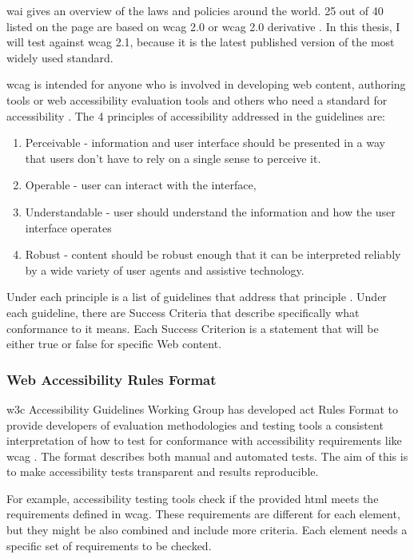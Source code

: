 \documentclass{master_thesis}
\begin{document}
\ac{wai} gives an overview of the laws and policies around the world. 25 out of 40 listed on the page are based on \ac{wcag} 2.0 or \ac{wcag} 2.0 derivative \citep{Mueller2018}. In this thesis, I will test against \ac{wcag} 2.1, because it is the latest published version of the most widely used standard.

\ac{wcag} is intended for anyone who is involved in developing web content, authoring tools or web accessibility evaluation tools and others who need a standard for accessibility \citep{Henry2023}. The 4 principles of accessibility addressed in the guidelines are:
\begin{enumerate}
	\item Perceivable - information and user interface should be presented in a way that users don't have to rely on a single sense to perceive it.
	\item Operable - user can interact with the interface,
	\item Understandable - user should understand the information and how the user interface operates
	\item Robust - content should be robust enough that it can be interpreted reliably by a wide variety of user agents and assistive technology.
\end{enumerate}
Under each principle is a list of guidelines that address that principle \citep{AGWGWP2022}. Under each guideline, there are Success Criteria that describe specifically what conformance to it means. Each Success Criterion is a statement that will be either true or false for specific Web content.

\subsubsection{Web Accessibility Rules Format}

\ac{w3c} Accessibility Guidelines Working Group has developed \ac{act} Rules Format to provide developers of evaluation methodologies and testing tools a consistent interpretation of how to test for conformance with accessibility requirements like \ac{wcag} \citep{Fiers2019}. The format describes both manual and automated tests. The aim of this is to make accessibility tests transparent and results reproducible.

For example, accessibility testing tools check if the provided \ac{html} meets the requirements defined in \ac{wcag}. These requirements are different for each element, but they might be also combined and include more criteria. Each element needs a specific set of requirements to be checked.
\end{document}
